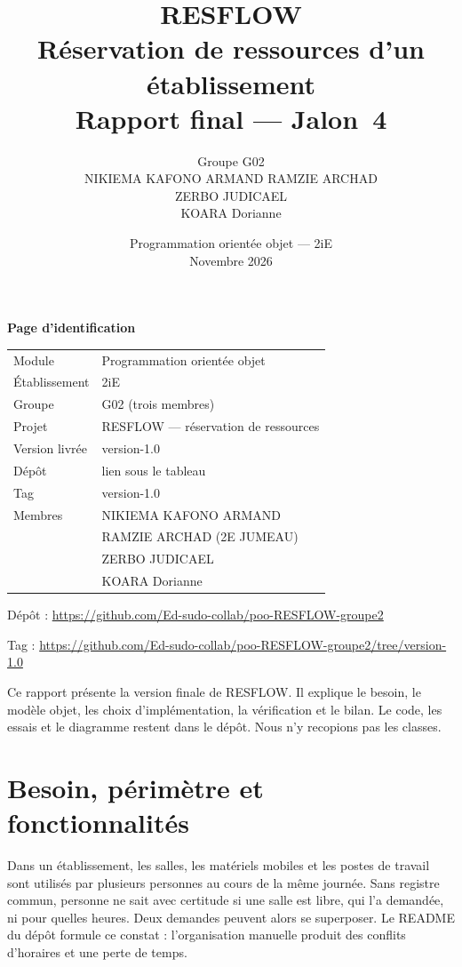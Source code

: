 \documentclass[11pt,a4paper]{article}
\title{RESFLOW\\Réservation de ressources d'un établissement\\Rapport final --- Jalon~4}
\author{Groupe G02\\
NIKIEMA KAFONO ARMAND RAMZIE ARCHAD\\
ZERBO JUDICAEL\\
KOARA Dorianne}
\date{Programmation orientée objet --- 2iE\\Novembre 2026}
\begin{document}
\maketitle
\thispagestyle{empty}

\noindent\textbf{Page d'identification}

\vspace{0.6em}
{\small
\begin{tabularx}{\textwidth}{@{}>{\raggedright\arraybackslash}p{2.4cm} >{\raggedright\arraybackslash}X@{}}
Module & Programmation orientée objet\\
Établissement & 2iE\\
Groupe & G02 (trois membres)\\
Projet & RESFLOW --- réservation de ressources\\
Version livrée & version-1.0\\
Dépôt & lien sous le tableau\\
Tag & version-1.0\\
Membres & NIKIEMA KAFONO ARMAND\\
 & RAMZIE ARCHAD (2E JUMEAU)\\
 & ZERBO JUDICAEL\\
 & KOARA Dorianne\\
\end{tabularx}
}

\vspace{0.4em}
\noindent Dépôt : \url{https://github.com/Ed-sudo-collab/poo-RESFLOW-groupe2}

\noindent Tag : \url{https://github.com/Ed-sudo-collab/poo-RESFLOW-groupe2/tree/version-1.0}

\vspace{0.8em}
\noindent
Ce rapport présente la version finale de RESFLOW. Il explique le besoin, le modèle objet, les choix d'implémentation, la vérification et le bilan. Le code, les essais et le diagramme restent dans le dépôt. Nous n'y recopions pas les classes.

\tableofcontents
\newpage

\section{Besoin, périmètre et fonctionnalités}

Dans un établissement, les salles, les matériels mobiles et les postes de travail sont utilisés par plusieurs personnes au cours de la même journée. Sans registre commun, personne ne sait avec certitude si une salle est libre, qui l'a demandée, ni pour quelles heures. Deux demandes peuvent alors se superposer. Le README du dépôt formule ce constat : l'organisation manuelle produit des conflits d'horaires et une perte de temps.
\end{document}
